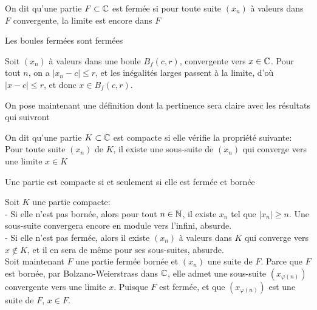 \documentclass{article}
\begin{document}
\begin{definition}
    On dit qu'une partie $F \subset \mathbb{C}$ est fermée si pour toute suite $(x_n)$ à valeurs dans $F$ convergente, la limite est encore dans $F$
\end{definition}

\begin{proposition}
    Les boules fermées sont fermées
\end{proposition}

\begin{preuve}
    Soit $(x_n)$ à valeurs dans une boule $B_f(c, r)$, convergente vers $x \in \mathbb{C}$. Pour tout $n$, on a $|x_n - c| \leq r$, et les inégalités larges passent à la limite, d'où $|x-c| \leq r$, et donc $x \in B_f(c, r)$.
\end{preuve}

On pose maintenant une définition dont la pertinence sera claire avec les résultats qui suivront

\begin{definition}
    On dit qu'une partie $K \subset \mathbb{C}$ est compacte si elle vérifie la propriété suivante:\\
    Pour toute suite $(x_n)$ de $K$, il existe une sous-suite de $(x_n)$ qui converge vers une limite $x \in K$
\end{definition}

\begin{proposition}
    Une partie est compacte si et seulement si elle est fermée et bornée
\end{proposition}

\begin{preuve}
    Soit $K$ une partie compacte:\\
    - Si elle n'est pas bornée, alors pour tout $n \in \mathbb{N}$, il existe $x_n$ tel que $|x_n| \geq n$. Une sous-suite convergera encore en module vers l'infini, absurde.\\
    - Si elle n'est pas fermée, alors il existe $(x_n)$ à valeurs dans $K$ qui converge vers $x \not\in K$, et il en sera de même pour ses sous-suites, absurde.\\

    Soit maintenant $F$ une partie fermée bornée et $(x_n)$ une suite de $F$. Parce que $F$ est bornée, par Bolzano-Weierstrass dans $\mathbb{C}$, elle admet une sous-suite $(x_{\varphi(n)})$ convergente vers une limite $x$. Puisque $F$ est fermée, et que $(x_{\varphi(n)})$ est une suite de $F$, $x \in F$.
\end{preuve}
\end{document}
